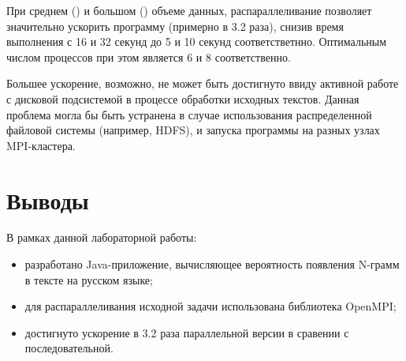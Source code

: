 При среднем () и большом () объеме данных, распараллеливание позволяет значительно ускорить программу (примерно в 3.2 раза), снизив время выполнения с 16 и 32 секунд до 5 и 10 секунд соответстветнно. Оптимальным числом процессов при этом является 6 и 8 соответственно.

Большее ускорение, возможно, не может быть достигнуто ввиду активной работе с дисковой подсистемой в процессе обработки исходных текстов. Данная проблема могла бы быть устранена в случае использования распределенной файловой системы (например, HDFS), и запуска программы на разных узлах MPI-кластера.

\section{Выводы}

В рамках данной лабораторной работы:

\begin{itemize}
	\item разработано Java-приложение, вычисляющее вероятность появления N-грамм в тексте на русском языке;
	\item для распараллеливания исходной задачи использована библиотека OpenMPI;
	\item достигнуто ускорение в 3.2 раза параллельной версии в сравении с последовательной.
\end{itemize}

